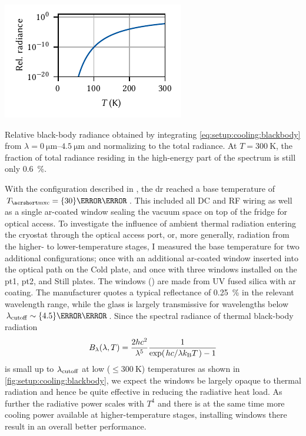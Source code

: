 \begin{marginfigure}
    \centering
    \includegraphics{img/pdf/setup/black_body_radiance}
    \caption[]{
        Relative black-body radiance obtained by integrating \cref{eq:setup:cooling:blackbody} from $\lambda = \qtyrange{0}{4.5}{\micro\meter}$ and normalizing to the total radiance.
        At $T=\qty{300}{\kelvin}$, the fraction of total radiance residing in the high-energy part of the spectrum is still only \qty{0.6}{\percent}.
    }
    \label{fig:setup:cooling:blackbody}
\end{marginfigure}

With the configuration described in , the \gls{dr} reached a base temperature of $\Tmxc = \qty{30}{\milli\kelvin}$.
This included all DC and RF wiring as well as a single \gls{ar}-coated window sealing the vacuum space on top of the fridge for optical access.
To investigate the influence of ambient thermal radiation entering the cryostat through the optical access port, or, more generally, radiation from the higher- to lower-temperature stages, I measured the base temperature for two additional configurations; once with an additional \gls{ar}-coated window inserted into the optical path on the Cold plate, and once with three windows installed on the \gls{pt1}, \gls{pt2}, and Still plates.
The windows (\thewindow) are made from UV fused silica with \gls{ar} coating.
The manufacturer quotes a typical reflectance of \qty{0.25}{\percent} in the relevant wavelength range, while the glass is largely transmissive for wavelengths below $\lambda_{\mr{cutoff}}\sim\qty{4.5}{\micro\meter}$.
Since the spectral radiance of thermal black-body radiation~\cite{Planck1900}
\begin{equation}\label{eq:setup:cooling:blackbody}
    B_\lambda(\lambda, T) = \frac{2 h c^2}{\lambda^5}\frac{1}{\exp(\flatfrac{hc}{\lambda\kb T}) - 1}
\end{equation}
is small up to $\lambda_{\mathrm{cutoff}}$ at low ($\leq\qty{300}{\kelvin}$) temperatures as shown in \cref{fig:setup:cooling:blackbody}, we expect the windows be largely opaque to thermal radiation and hence be quite effective in reducing the radiative heat load.
As further the radiative power scales with $T^4$ and there is at the same time more cooling power available at higher-temperature stages, installing windows there result in an overall better performance.

